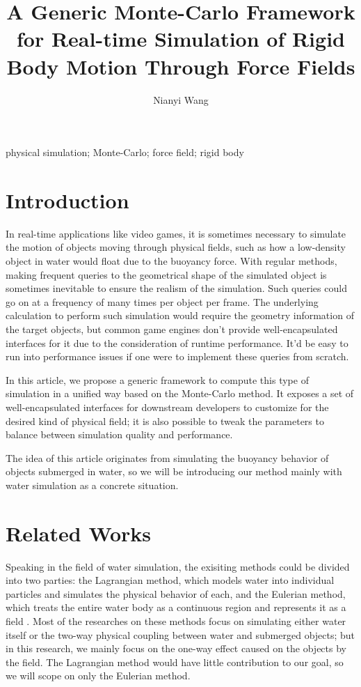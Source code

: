 \documentclass{article}
\title{A Generic Monte-Carlo Framework for Real-time Simulation of Rigid Body Motion Through Force Fields}
\author{\begin{redacted}Nianyi Wang\end{redacted}}
\date{}
\begin{document}
\maketitle

\begin{abstract}
	\lorempar[1]
\end{abstract}

\begin{keywords}
	physical simulation;
	Monte-Carlo;
	force field;
	rigid body
\end{keywords}

\section{Introduction}

In real-time applications like video games, it is sometimes necessary to simulate the motion of objects moving through physical fields, such as how a low-density object in water would float due to the buoyancy force.
With regular methods, making frequent queries to the geometrical shape of the simulated object is sometimes inevitable to ensure the realism of the simulation.
Such queries could go on at a frequency of many times per object per frame.
The underlying calculation to perform such simulation would require the geometry information of the target objects, but common game engines don't provide well-encapsulated interfaces for it due to the consideration of runtime performance.
It'd be easy to run into performance issues if one were to implement these queries from scratch.

In this article, we propose a generic framework to compute this type of simulation in a unified way based on the Monte-Carlo method.
It exposes a set of well-encapsulated interfaces for downstream developers to customize for the desired kind of physical field;
it is also possible to tweak the parameters to balance between simulation quality and performance.

The idea of this article originates from simulating the buoyancy behavior of objects submerged in water, so we will be introducing our method mainly with water simulation as a concrete situation.

\section{Related Works}

Speaking in the field of water simulation, the exisiting methods could be divided into two parties: the Lagrangian method, which models water into individual particles and simulates the physical behavior of each, and the Eulerian method, which treats the entire water body as a continuous region and represents it as a field \cite{GOU09}.
Most of the researches on these methods focus on simulating either water itself or the two-way physical coupling between water and submerged objects;
but in this research, we mainly focus on the one-way effect caused on the objects by the field.
The Lagrangian method would have little contribution to our goal, so we will scope on only the Eulerian method.
\end{document}
